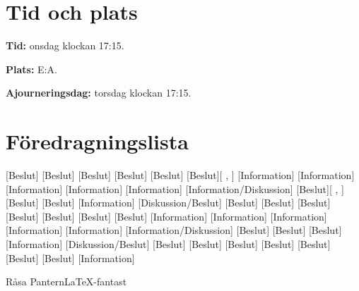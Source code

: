 \documentclass{dseknotice}
\begin{document}
\maketitle
\section*{Tid och plats}
\textbf{Tid:} onsdag  klockan 17:15.

\textbf{Plats:} E:A.

\textbf{Ajourneringsdag:} torsdag  klockan 17:15.

\section*{Föredragningslista}
\begin{agenda}
    [Beslut]
    [Beslut]
    [Beslut]
    [Beslut]
    [Beslut]
    [Beslut][
      ,
    ]
    [Information]
    [Information]
    [Information]
    [Information]
    [Information]
    [Information/Diskussion]
    [Beslut][
      ,
    ]
    [Beslut]
    [Beslut]
    [Information]
    [Diskussion/Beslut]
    [Beslut]
    [Beslut]
    [Beslut]
    [Beslut]
    [Beslut]
    [Beslut]
    [Beslut]
    [Information]
    [Information]
    [Information]
    [Information]
    [Information]
    [Information/Diskussion]
    [Beslut]
    [Beslut]
    [Beslut]
    [Information]
    [Diskussion/Beslut]
    [Beslut]
    [Beslut]
    [Beslut]
    [Beslut]
    [Beslut]
    [Beslut]
    [Beslut]
    [Information]
\end{agenda}

\medskip

\signature{För D-sektionen, dag som ovan}{Råsa Pantern}{\LaTeX-fantast}
\end{document}

